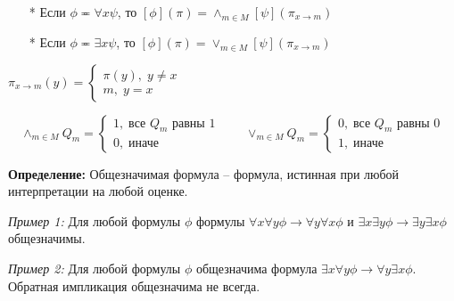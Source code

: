 \hfill \break
\begin{minipage}{0.6\textwidth}
  \begin{itemize}
    \item[*] Если $\phi\eqcirc \forall x \psi$, то $[\phi](\pi)=\land_{m\in M}[\psi](\pi_{x\to m})$
    \item[*] Если $\phi\eqcirc \exists x \psi$, то $[\phi](\pi)=\lor_{m\in M}[\psi](\pi_{x\to m})$
    \end{itemize}
\end{minipage}
\hfill
\begin{minipage}{0.4\textwidth}
    $\pi_{x\to m} (y)= 
    \begin{cases}
        \pi(y), \; y\neq x \\
        m, \; y=x
    \end{cases}$
\end{minipage}
$$
\land_{m\in M}Q_m=
    \begin{cases}
        1, \; \text{все }Q_m \text{ равны 1} \\
        0, \; \text{иначе}
    \end{cases}
    \qquad 
\lor_{m\in M}Q_m=
    \begin{cases}
        0, \; \text{все }Q_m \text{ равны 0} \\
        1, \; \text{иначе}
    \end{cases}
$$

\hfill \break
\textbf{Определение:} Общезначимая формула -- формула, истинная при любой интерпретации на любой оценке.

\textit{Пример 1:} Для любой формулы $\phi$ формулы $\forall x\forall y\phi \to \forall y\forall x\phi$ и $\exists x\exists y\phi \to \exists y\exists x\phi$ общезначимы.

\textit{Пример 2:} Для любой формулы $\phi$ общезначима формула $\exists x\forall y\phi \to \forall y\exists x\phi$. Обратная импликация общезначима не всегда.

